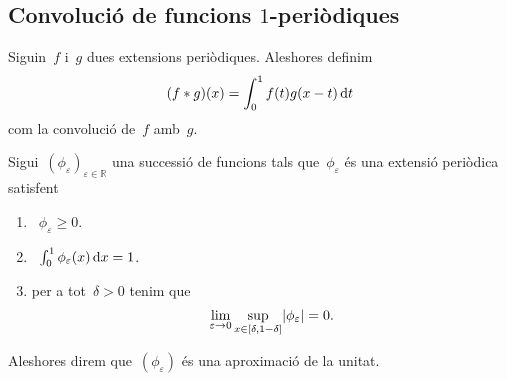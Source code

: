 \documentclass[../../main.tex]{subfiles}
\begin{document}
	\subsection{Convolució de funcions \ensuremath{1}-periòdiques}
	\begin{definition}
		\label{def:convolució de dues extensions periòdiques}
		Siguin~\(f\) i~\(g\) dues extensions periòdiques.
		Aleshores definim
		\[
		    (f\mathbin{\ast} g)(x)=\int_{0}^{1}f(t)g(x-t)\mathop{}\!\mathrm{d} t
		\]
		com la convolució de~\(f\) amb~\(g\).
	\end{definition}
	\begin{definition}
		\label{def:aproximació de la unitat en extensions periòdiques}
		Sigui~\((\phi_{\varepsilon})_{\varepsilon\in\mathbb{R}}\) una successió de funcions tals que~\(\phi_{\varepsilon}\) és una extensió periòdica satisfent
		\begin{enumerate}
			\item~\(\phi_{\varepsilon}\geq0\).
			\item~\(\int_{0}^{1}\phi_{\varepsilon}(x)\mathop{}\!\mathrm{d} x=1\).
			\item per a tot~\(\delta>0\) tenim que
			\[
			    \lim_{\varepsilon\to0}\sup_{x\in[\delta,1-\delta]}\abs{\phi_{\varepsilon}}=0.
			\]
		\end{enumerate}
		Aleshores direm que~\((\phi_{\varepsilon})\) és una aproximació de la unitat.
	\end{definition}
\end{document}
